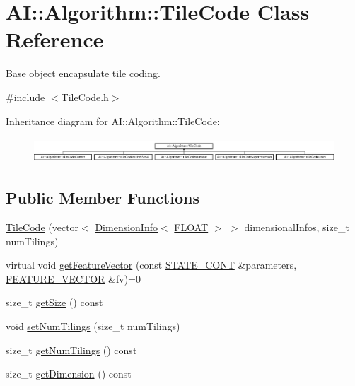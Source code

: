 \hypertarget{classAI_1_1Algorithm_1_1TileCode}{\section{A\+I\+:\+:Algorithm\+:\+:Tile\+Code Class Reference}
\label{classAI_1_1Algorithm_1_1TileCode}
}


Base object encapsulate tile coding.  




{\ttfamily \#include $<$Tile\+Code.\+h$>$}

Inheritance diagram for A\+I\+:\+:Algorithm\+:\+:Tile\+Code\+:\begin{figure}[H]
\begin{center}
\leavevmode
\includegraphics[height=0.957265cm]{classAI_1_1Algorithm_1_1TileCode}
\end{center}
\end{figure}
\subsection*{Public Member Functions}
\begin{DoxyCompactItemize}
\item 
\hyperlink{classAI_1_1Algorithm_1_1TileCode_a5c143dc170aca9699e68c808d91f1ffe}{Tile\+Code} (vector$<$ \hyperlink{classAI_1_1Algorithm_1_1DimensionInfo}{Dimension\+Info}$<$ \hyperlink{namespaceAI_a41b74884a20833db653dded3918e05c3}{F\+L\+O\+A\+T} $>$ $>$ dimensional\+Infos, size\+\_\+t num\+Tilings)
\item 
virtual void \hyperlink{classAI_1_1Algorithm_1_1TileCode_ad2ba639c550e7d267d066e54b20f6000}{get\+Feature\+Vector} (const \hyperlink{namespaceAI_aff63ec21d97dd5f086fddbc3103f5707}{S\+T\+A\+T\+E\+\_\+\+C\+O\+N\+T} \&parameters, \hyperlink{namespaceAI_a23a39e1b301a5c1345fa508796940631}{F\+E\+A\+T\+U\+R\+E\+\_\+\+V\+E\+C\+T\+O\+R} \&fv)=0
\item 
size\+\_\+t \hyperlink{classAI_1_1Algorithm_1_1TileCode_a3d757b2d7e6cf273c54f007230b69406}{get\+Size} () const 
\item 
void \hyperlink{classAI_1_1Algorithm_1_1TileCode_aad4bf93d21b47fe00c8e64957157dca1}{set\+Num\+Tilings} (size\+\_\+t num\+Tilings)
\item 
size\+\_\+t \hyperlink{classAI_1_1Algorithm_1_1TileCode_a540d24d750bf47835ed950b4ef54486a}{get\+Num\+Tilings} () const 
\item 
size\+\_\+t \hyperlink{classAI_1_1Algorithm_1_1TileCode_aa80f909ef2bf2039c4ea7b468bf796a5}{get\+Dimension} () const 
\end{DoxyCompactItemize}
